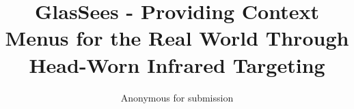 \documentclass{sigchi}
\begin{document}
\title{GlasSees - Providing Context Menus for the Real World Through Head-Worn Infrared Targeting}

\author{
 \alignauthor Anonymous for submission
}

\maketitle

\begin{abstract}

\end{abstract}















%
%
%
%
%
\balance




\end{document}
